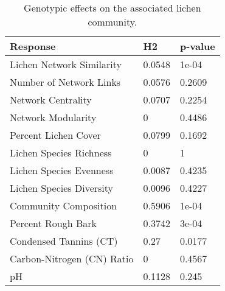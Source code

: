 \begin{table}[ht]
\centering
\begin{tabular}{lll}
  \hline
Response & H2 & p-value \\ 
  \hline
Lichen Network Similarity & 0.0548 & 1e-04 \\ 
  Number of Network Links & 0.0576 & 0.2609 \\ 
  Network Centrality & 0.0707 & 0.2254 \\ 
  Network Modularity & 0 & 0.4486 \\ 
  Percent Lichen Cover & 0.0799 & 0.1692 \\ 
  Lichen Species Richness & 0 & 1 \\ 
  Lichen Species Evenness & 0.0087 & 0.4235 \\ 
  Lichen Species Diversity & 0.0096 & 0.4227 \\ 
  Community Composition & 0.5906 & 1e-04 \\ 
  Percent Rough Bark & 0.3742 & 3e-04 \\ 
  Condensed Tannins (CT) & 0.27 & 0.0177 \\ 
  Carbon-Nitrogen (CN) Ratio & 0 & 0.4567 \\ 
  pH & 0.1128 & 0.245 \\ 
   \hline
\end{tabular}
\caption{Genotypic effects on the associated lichen community.} 
\label{tab:h2_table}
\end{table}
